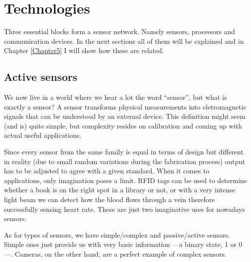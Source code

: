 
\chapter{Technologies} %

\label{Chapter3} %




Three essential blocks form a sensor network. Namely sensors, processors and communication devices\cite{chong2003sensor}. In the next sections all of them will be explained and in Chapter \ref{Chapter5} I will show how these are related.



\section{Active sensors}

We now live in a world where we hear a lot the word ``sensor'', but what is exactly a sensor? A sensor transforms physical measurements into eletromagnetic signals that can be understood by an external device. This definition might seem (and is) quite simple, but complexity resides on calibration and coming up with actual useful applications. 

Since every sensor from the same family is equal in terms of design but different in reality (due to small random variations during the fabrication process) output has to be adjusted to agree with a given standard. When it comes to applications, only imagination poses a limit. RFID tags can be used to determine whether a book is on the right spot in a library or not, or with a very intense light beam we can detect how the blood flows through a vein therefore successfully sensing heart rate. These are just two imaginative uses for nowadays sensors.

As for types of sensors, we have simple/complex and passive/active sensors. Simple ones just provide us with very basic information ---a binary state, 1 or 0---. Cameras, on the other hand, are a perfect example of complex sensors. 

